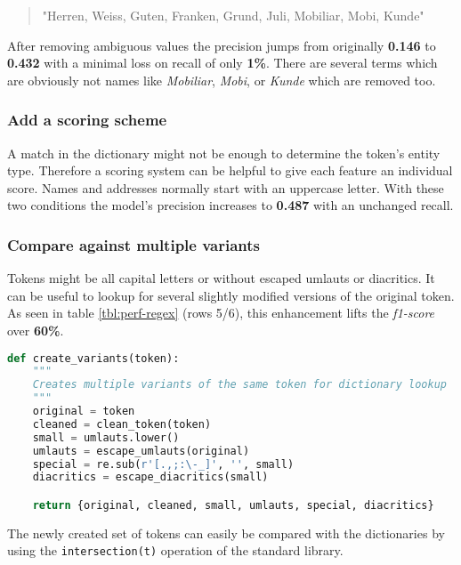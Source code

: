 \begin{quote}
    "Herren, Weiss, Guten, Franken, Grund, Juli, Mobiliar, Mobi, Kunde"
\end{quote}

After removing ambiguous values the precision jumps from originally \textbf{0.146} to \textbf{0.432} with a minimal loss on recall of only \textbf{1\%}. There are
several terms which are obviously not names like \emph{Mobiliar}, \emph{Mobi}, or \emph{Kunde} which are removed too.

\subsubsection{Add a scoring scheme}

A match in the dictionary might not be enough to determine the token's entity type. Therefore a scoring system can be helpful to give each feature an individual score.
Names and addresses normally start with an uppercase letter. With these two conditions the model's precision increases to \textbf{0.487} with an unchanged
recall. 

\subsubsection{Compare against multiple variants}

Tokens might be all capital letters or without escaped umlauts or \gls{diacritic}s. It can be useful to lookup for several slightly modified versions of the original token. As
seen in table \ref{tbl:perf-regex} (rows 5/6), this enhancement lifts the \emph{f1-score} over \textbf{60\%}.

\begin{lstlisting}[language=Python, label={code:regex-variants}, caption=Creating different variants of a single token]
def create_variants(token):
    """
    Creates multiple variants of the same token for dictionary lookup
    """
    original = token
    cleaned = clean_token(token)
    small = umlauts.lower()
    umlauts = escape_umlauts(original)
    special = re.sub(r'[.,;:\-_]', '', small)
    diacritics = escape_diacritics(small)

    return {original, cleaned, small, umlauts, special, diacritics}
\end{lstlisting}

The newly created set of tokens can easily be compared with the dictionaries by using the \verb|intersection(t)| operation of the standard library.

